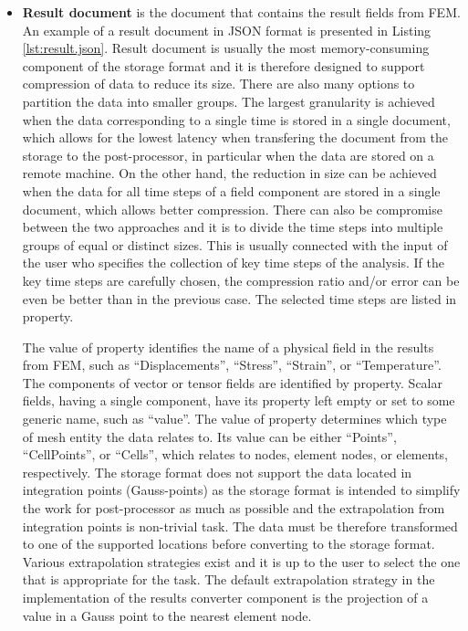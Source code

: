 \begin{itemize}
    \item \textbf{Result document} is the document that contains the result fields from FEM. An example of a result document in JSON format is presented in Listing \ref{lst:result.json}. Result document is usually the most memory-consuming component of the storage format and it is therefore designed to support compression of data to reduce its size. There are also many options to partition the data into smaller groups. The largest granularity is achieved when the data corresponding to a single time is stored in a single document, which allows for the lowest latency when transfering the document from the storage to the post-processor, in particular when the data are stored on a remote machine. On the other hand, the reduction in size can be achieved when the data for all time steps of a field component are stored in a single document, which allows better compression. There can also be compromise between the two approaches and it is to divide the time steps into multiple groups of equal or distinct sizes. This is usually connected with the input of the user who specifies the collection of key time steps of the analysis. If the key time steps are carefully chosen, the compression ratio and/or error can be even be better than in the previous case. The selected time steps are listed in  property.

    The value of  property identifies the name of a physical field in the results from FEM, such as ``Displacements'', ``Stress'', ``Strain'', or ``Temperature''. The components of vector or tensor fields are identified by  property. Scalar fields, having a single component, have its  property left empty or set to some generic name, such as ``value''. The value of  property determines which type of mesh entity the data relates to. Its value can be either ``Points'', ``CellPoints'', or ``Cells'', which relates to nodes, element nodes, or elements, respectively. The storage format does not support the data located in integration points (Gauss-points) as the storage format is intended to simplify the work for post-processor as much as possible and the extrapolation from integration points is non-trivial task. The data must be therefore transformed to one of the supported locations before converting to the storage format. Various extrapolation strategies exist and it is up to the user to select the one that is appropriate for the task. The default extrapolation strategy in the implementation of the results converter component is the projection of a value in a Gauss point to the nearest element node.


\end{itemize}
